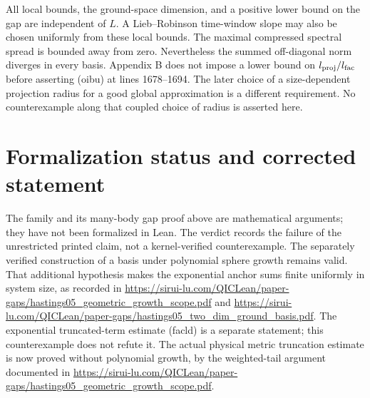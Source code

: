 \documentclass{article}
\begin{document}
All local bounds, the ground-space dimension, and a positive lower bound
on the gap are independent of $L$. A Lieb--Robinson time-window slope may
also be chosen uniformly from these local bounds. The maximal compressed
spectral spread is bounded away from zero. Nevertheless the summed
off-diagonal norm diverges in every basis.
Appendix B does not impose a lower bound on $l_{\rm proj}/l_{\rm fac}$
before asserting (oibu) at lines 1678--1694. The later choice of a
size-dependent projection radius for a good global approximation is a
different requirement. No counterexample along that coupled choice of
radius is asserted here.

\section{Formalization status and corrected statement}

The family and its many-body gap proof above are mathematical arguments;
they have not been formalized in Lean. The verdict records the failure of
the unrestricted printed claim, not a kernel-verified counterexample.
The separately verified construction of a basis under polynomial
sphere growth remains valid. That additional hypothesis makes the
exponential anchor sums finite uniformly in system size, as recorded in
\url{https://sirui-lu.com/QICLean/paper-gaps/hastings05_geometric_growth_scope.pdf} and
\url{https://sirui-lu.com/QICLean/paper-gaps/hastings05_two_dim_ground_basis.pdf}.
The exponential truncated-term estimate (facld) is a separate statement;
this counterexample does not refute it. The actual physical metric truncation
estimate is now proved without polynomial growth, by the weighted-tail
argument documented in \url{https://sirui-lu.com/QICLean/paper-gaps/hastings05_geometric_growth_scope.pdf}.



\end{document}
